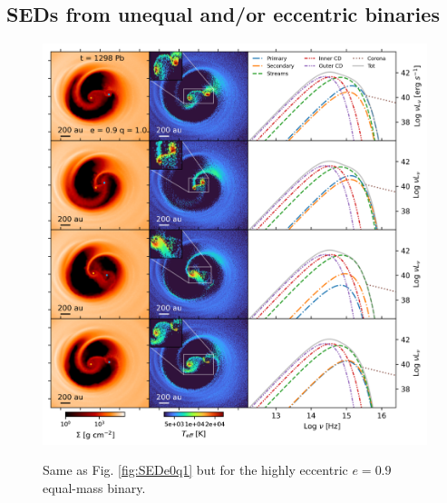 \documentclass{aa}
\begin{document}
\newpage
\begin{appendix}
\section{SEDs from unequal and/or eccentric binaries} \label{sec:appendix}
\begin{figure}
    \includegraphics[width=\textwidth]{Figures/e09q1_hr01_md001_3a_12989_PgasPrad.pdf} \\
    \caption{
    Same as Fig. \ref{fig:SEDe0q1} but for the highly eccentric $e=0.9$ equal-mass binary.}
    \label{fig:SEDe09q1} 
\end{figure}
\begin{figure}

\end{figure}
\end{appendix}
\end{document}
